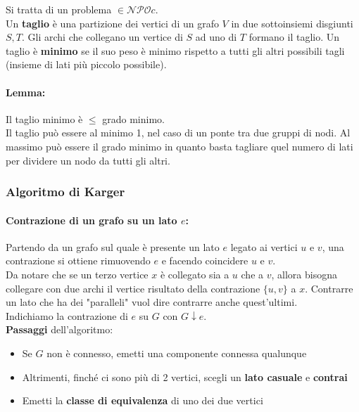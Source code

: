 Si tratta di un problema $ \in \mathcal{NPO}c$.\\

Un \textbf{taglio} è una partizione dei vertici di un grafo $V$ in due sottoinsiemi disgiunti $S, T$. Gli archi che collegano un vertice di $S$ ad uno di $T$ formano il taglio. Un taglio è \textbf{minimo} se il suo peso è minimo rispetto a tutti gli altri possibili tagli (insieme di lati più piccolo possibile).\\

\paragraph{Lemma:} Il taglio minimo è $\leq$ grado minimo.\\

Il taglio può essere al minimo 1, nel caso di un ponte tra due gruppi di nodi. Al massimo può essere il grado minimo in quanto basta tagliare quel numero di lati per dividere un nodo da tutti gli altri.\\

\newpage

\subsubsection{Algoritmo di Karger}

\paragraph{Contrazione di un grafo su un lato $e$:} Partendo da un grafo sul quale è presente un lato $e$ legato ai vertici $u$ e $v$, una contrazione si ottiene rimuovendo $e$ e facendo coincidere $u$ e $v$. \\

Da notare che se un terzo vertice $x$ è collegato sia a $u$ che a $v$, allora bisogna collegare con due archi il vertice risultato della contrazione $\{u,v\}$ a $x$. Contrarre un lato che ha dei "paralleli" vuol dire contrarre anche quest'ultimi.\\

Indichiamo la contrazione di $e$ su $G$ con $G \downarrow e$.\\

\textbf{Passaggi} dell'algoritmo:
\begin{itemize}
	\item Se $G$ non è connesso, emetti una componente connessa qualunque
	\item Altrimenti, finché ci sono più di 2 vertici, scegli un \textbf{lato casuale} e \textbf{contrai}
	\item Emetti la \textbf{classe di equivalenza} di uno dei due vertici
\end{itemize}

